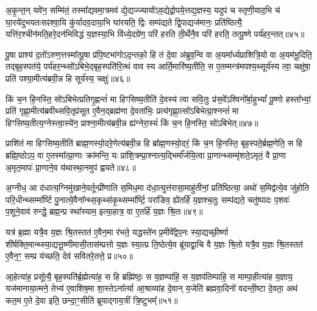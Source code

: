 अ॒कृ॒न्त॒न् यवे॑न॒ सम्मि॑तं॒ तस्मा᳚द्यवमा॒त्रमव॑ द्ये॒द्यज्ज्यायो॑\-ऽव॒द्येद्रो॒पये॒त्तद्य॒ज्ञस्य॒ यदुप॑ च स्तृणी॒याद॒भि च॑ घा॒रये॑दुभयतःसꣴश्वा॒यि कु॑र्यादव॒दाया॒भि घा॑रयति॒ द्विः सम्प॑द्यते द्वि॒पाद्यज॑मानः॒ प्रति॑ष्ठित्यै॒ यत्ति॑र॒श्चीन॑मति॒हरे॒दन॑भिविद्धं य॒ज्ञस्या॒भि वि॑ध्ये॒दग्रे॑ण॒ परि॑ हरति ती॒र्थेनै॒व परि॑ हरति॒ तत्पू॒ष्णे पर्य॑हर॒न्तत्॥४५॥

पू॒षा प्राश्य॑ द॒तो॑\-ऽरुण॒त्तस्मा᳚त्पू॒षा प्र॑पि॒ष्टभा॑गो\-ऽद॒न्तको॒ हि तं दे॒वा अ॑ब्रुव॒न्वि वा अ॒यमा᳚र्ध्यप्राशित्रि॒यो वा अ॒यम॑भू॒दिति॒ तद्बृह॒स्पत॑ये॒ पर्य॑हर॒न्थ्सो॑\-ऽबिभे॒द्बृह॒स्पति॑रि॒त्थं वाव स्य आर्ति॒मारि॑ष्य॒तीति॒ स ए॒तम्मन्त्र॑मपश्य॒थ्सूर्य॑स्य त्वा॒ चक्षु॑षा॒ प्रति॑ पश्या॒मीत्य॑ब्रवी॒न्न हि सूर्य॑स्य॒ चक्षुः॑॥४६॥

किं च॒न हि॒नस्ति॒ सो॑\-ऽबिभेत्प्रतिगृ॒ह्णन्तं॑ मा हिꣳसिष्य॒तीति॑ दे॒वस्य॑ त्वा सवि॒तुः प्र॑स॒वे᳚\-ऽश्विनो᳚र्बा॒हु\-भ्यां᳚ पू॒ष्णो हस्ता᳚भ्यां॒ प्रति॑ गृह्णा॒मीत्य॑ब्रवीथ्सवि॒तृप्र॑सूत ए॒वैन॒द्ब्रह्म॑णा दे॒वता॑भिः॒ प्रत्य॑गृह्णा॒त्सो॑\-ऽबिभेत्प्रा॒श्नन्तं॑ मा हिꣳसिष्य॒तीत्य॒ग्नेस्त्वा॒स्ये॑न॒ प्राश्ना॒मीत्य॑ब्रवी॒न्न ह्य॑ग्नेरा॒स्यं॑ किं च॒न हि॒नस्ति॒ सो॑\-ऽबिभेत्॥४७॥

प्राशि॑तं मा हिꣳसिष्य॒तीति॑ ब्राह्म॒णस्यो॒दरे॒णेत्य॑ब्रवी॒न्न हि ब्रा᳚ह्म॒णस्यो॒दरं॒ किं च॒न हि॒नस्ति॒ बृह॒स्पते॒र्ब्रह्म॒णेति॒ स हि ब्रह्मि॒ष्ठो\-ऽप॒ वा ए॒तस्मा᳚त्प्रा॒णाः क्रा॑मन्ति॒ यः प्रा॑शि॒त्रम्प्रा॒श्नात्य॒द्भिर्मा᳚र्जयि॒त्वा प्रा॒णान्थ्सम्मृ॑शते॒\-ऽमृतं॒ वै प्रा॒णा अ॒मृत॒मापः॑ प्रा॒णाने॒व य॑थास्था॒नमुप॑ ह्वयते॥४८॥

{\anuvakamend[{प्रा॒श्ञी॒याद्धोता॑ य॒ज्ञन्निर॑हर॒न्तच्चक्षु॑रा॒स्य॑ङ्किं च॒न हि॒नस्ति॒ सो॑\-ऽबिभे॒च्चतु॑श्चत्वारिꣳशच्च॥८॥}]}

अ॒ग्नीध॒ आ द॑धात्य॒ग्निमु॑खाने॒वर्तून्प्री॑णाति स॒मिध॒मा द॑धा॒त्युत्त॑रासा॒माहु॑तीनां॒ प्रति॑ष्ठित्या॒ अथो॑ स॒मिद्व॑त्ये॒व जु॑होति परि॒धीन्थ्सम्मा᳚र्ष्टि पु॒नात्ये॒वैना᳚न्थ्स॒कृथ्स॑कृ॒थ्सम्मा᳚र्ष्टि॒ परा॑ङिव॒ ह्ये॑तर्\mbox{}हि॑ य॒ज्ञश्च॒तुः सम्प॑द्यते॒ चतु॑ष्पादः प॒शवः॑ प॒शूने॒वाव॑ रुन्द्धे॒ ब्रह्म॒न्प्र स्था᳚स्याम॒ इत्या॒हात्र॒ वा ए॒तर्\mbox{}हि॑ य॒ज्ञः श्रि॒तः॥४९॥

यत्र॑ ब्र॒ह्मा यत्रै॒व य॒ज्ञः श्रि॒तस्तत॑ ए॒वैन॒मा र॑भते॒ यद्धस्ते॑न प्र॒मीवे᳚द्वेप॒नः स्या॒द्यच्छी॒र्ष्णा शी॑र्\mbox{}षक्ति॒मान्थ्स्या॒द्यत्तू॒ष्णीमासी॒तास॑म्प्रत्तो य॒ज्ञः स्या॒त्प्र ति॒ष्ठेत्ये॒व ब्रू॑याद्वा॒चि वै य॒ज्ञः श्रि॒तो यत्रै॒व य॒ज्ञः श्रि॒तस्तत॑ ए॒वैन॒ꣳ॒ सम्प्र य॑च्छति॒ देव॑ सवितरे॒तत्ते॒ प्र॥५०॥

आ॒हेत्या॑ह॒ प्रसू᳚त्यै॒ बृह॒स्पति॑र्ब्र॒ह्मेत्या॑ह॒ स हि ब्रह्मि॑ष्ठः॒ स य॒ज्ञम्पा॑हि॒ स य॒ज्ञप॑तिम्पाहि॒ स माम्पा॒हीत्या॑ह य॒ज्ञाय॒ यज॑मानाया॒त्मने॒ तेभ्य॑ ए॒वाशिष॒मा शा॒स्ते\-ऽना᳚र्त्या आ॒श्राव्या॑ह दे॒वान् य॒जेति॑ ब्रह्मवा॒दिनो॑ वदन्ती॒ष्टा दे॒वता॒ अथ॑ कत॒म ए॒ते दे॒वा इति॒ छन्दा॒ꣳ॒सीति॑ ब्रूयाद्गाय॒त्रीं त्रि॒ष्टुभम्᳚॥५१॥

